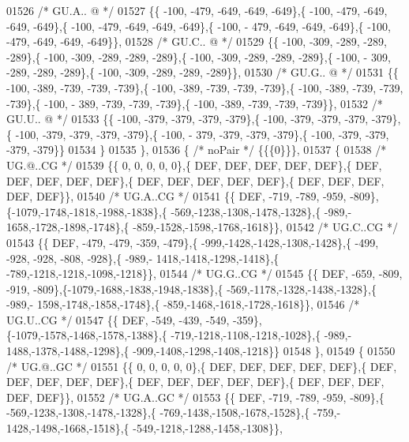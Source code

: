 \begin{DoxyCode}
01526 \textcolor{comment}{/* GU.A.. @ */}
01527 \{\{ -100, -479, -649, -649, -649\},\{ -100, -479, -649, -649, -649\},\{ -100, -479, -649, -649, -649\},\{ -100, -
      479, -649, -649, -649\},\{ -100, -479, -649, -649, -649\}\},
01528 \textcolor{comment}{/* GU.C.. @ */}
01529 \{\{ -100, -309, -289, -289, -289\},\{ -100, -309, -289, -289, -289\},\{ -100, -309, -289, -289, -289\},\{ -100, -
      309, -289, -289, -289\},\{ -100, -309, -289, -289, -289\}\},
01530 \textcolor{comment}{/* GU.G.. @ */}
01531 \{\{ -100, -389, -739, -739, -739\},\{ -100, -389, -739, -739, -739\},\{ -100, -389, -739, -739, -739\},\{ -100, -
      389, -739, -739, -739\},\{ -100, -389, -739, -739, -739\}\},
01532 \textcolor{comment}{/* GU.U.. @ */}
01533 \{\{ -100, -379, -379, -379, -379\},\{ -100, -379, -379, -379, -379\},\{ -100, -379, -379, -379, -379\},\{ -100, -
      379, -379, -379, -379\},\{ -100, -379, -379, -379, -379\}\}
01534 \}
01535 \},
01536 \{ \textcolor{comment}{/* noPair */} \{\{\{0\}\}\},
01537 \{
01538 \textcolor{comment}{/* UG.@..CG */}
01539 \{\{    0,    0,    0,    0,    0\},\{  DEF,  DEF,  DEF,  DEF,  DEF\},\{  DEF,  DEF,  DEF,  DEF,  DEF\},\{  DEF,  
      DEF,  DEF,  DEF,  DEF\},\{  DEF,  DEF,  DEF,  DEF,  DEF\}\},
01540 \textcolor{comment}{/* UG.A..CG */}
01541 \{\{  DEF, -719, -789, -959, -809\},\{-1079,-1748,-1818,-1988,-1838\},\{ -569,-1238,-1308,-1478,-1328\},\{ -989,-
      1658,-1728,-1898,-1748\},\{ -859,-1528,-1598,-1768,-1618\}\},
01542 \textcolor{comment}{/* UG.C..CG */}
01543 \{\{  DEF, -479, -479, -359, -479\},\{ -999,-1428,-1428,-1308,-1428\},\{ -499, -928, -928, -808, -928\},\{ -989,-
      1418,-1418,-1298,-1418\},\{ -789,-1218,-1218,-1098,-1218\}\},
01544 \textcolor{comment}{/* UG.G..CG */}
01545 \{\{  DEF, -659, -809, -919, -809\},\{-1079,-1688,-1838,-1948,-1838\},\{ -569,-1178,-1328,-1438,-1328\},\{ -989,-
      1598,-1748,-1858,-1748\},\{ -859,-1468,-1618,-1728,-1618\}\},
01546 \textcolor{comment}{/* UG.U..CG */}
01547 \{\{  DEF, -549, -439, -549, -359\},\{-1079,-1578,-1468,-1578,-1388\},\{ -719,-1218,-1108,-1218,-1028\},\{ -989,-
      1488,-1378,-1488,-1298\},\{ -909,-1408,-1298,-1408,-1218\}\}
01548 \},
01549 \{
01550 \textcolor{comment}{/* UG.@..GC */}
01551 \{\{    0,    0,    0,    0,    0\},\{  DEF,  DEF,  DEF,  DEF,  DEF\},\{  DEF,  DEF,  DEF,  DEF,  DEF\},\{  DEF,  
      DEF,  DEF,  DEF,  DEF\},\{  DEF,  DEF,  DEF,  DEF,  DEF\}\},
01552 \textcolor{comment}{/* UG.A..GC */}
01553 \{\{  DEF, -719, -789, -959, -809\},\{ -569,-1238,-1308,-1478,-1328\},\{ -769,-1438,-1508,-1678,-1528\},\{ -759,-
      1428,-1498,-1668,-1518\},\{ -549,-1218,-1288,-1458,-1308\}\},

\end{DoxyCode}
